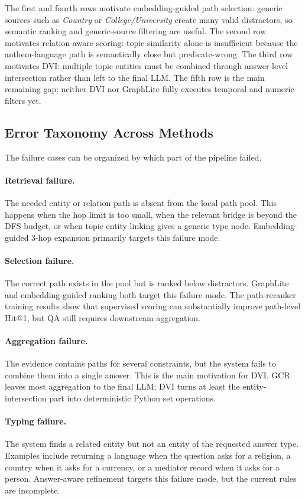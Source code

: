 \documentclass[10pt,twocolumn]{article}
\begin{document}
The first and fourth rows motivate embedding-guided path selection: generic sources such as \emph{Country} or \emph{College/University} create many valid distractors, so semantic ranking and generic-source filtering are useful. The second row motivates relation-aware scoring: topic similarity alone is insufficient because the anthem-language path is semantically close but predicate-wrong. The third row motivates DVI: multiple topic entities must be combined through answer-level intersection rather than left to the final LLM. The fifth row is the main remaining gap: neither DVI nor GraphLite fully executes temporal and numeric filters yet.

\subsection{Error Taxonomy Across Methods}
The failure cases can be organized by which part of the pipeline failed.

\paragraph{Retrieval failure.}
The needed entity or relation path is absent from the local path pool. This happens when the hop limit is too small, when the relevant bridge is beyond the DFS budget, or when topic entity linking gives a generic type node. Embedding-guided 3-hop expansion primarily targets this failure mode.

\paragraph{Selection failure.}
The correct path exists in the pool but is ranked below distractors. GraphLite and embedding-guided ranking both target this failure mode. The path-reranker training results show that supervised scoring can substantially improve path-level Hit@1, but QA still requires downstream aggregation.

\paragraph{Aggregation failure.}
The evidence contains paths for several constraints, but the system fails to combine them into a single answer. This is the main motivation for DVI. GCR leaves most aggregation to the final LLM; DVI turns at least the entity-intersection part into deterministic Python set operations.

\paragraph{Typing failure.}
The system finds a related entity but not an entity of the requested answer type. Examples include returning a language when the question asks for a religion, a country when it asks for a currency, or a mediator record when it asks for a person. Answer-aware refinement targets this failure mode, but the current rules are incomplete.
\end{document}
